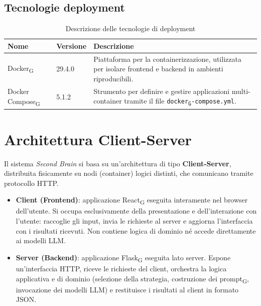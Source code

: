 \documentclass[11pt,a4paper]{article}
\newcommand{\gls}[1]{#1\textsubscript{G}}
\begin{document}
\subsection{Tecnologie deployment}
\begin{table}[H]
    \centering
    \begin{tabular}{|p{}|p{}|p{}|}
        \hline
        \textbf{Nome} & \textbf{Versione} & \textbf{Descrizione} \\
        \hline
        \gls{Docker} & 29.4.0 & Piattaforma per la containerizzazione, utilizzata per isolare frontend e backend in ambienti riproducibili. \\
        \hline
        \gls{Docker Compose} & 5.1.2 & Strumento per definire e gestire applicazioni multi-container tramite il file \texttt{\gls{docker}-compose.yml}. \\
        \hline
    \end{tabular}
    \caption{Descrizione delle tecnologie di deployment}
    \label{tab:tecnologie_deployment}
\end{table}

\newpage

\section{Architettura Client-Server}
Il sistema \textit{Second Brain} si basa su un'architettura di tipo \textbf{Client-Server}, distribuita fisicamente su nodi (container) logici distinti, che comunicano tramite protocollo HTTP.

\begin{itemize}
    \item \textbf{Client (Frontend)}: applicazione \gls{React} eseguita interamente nel browser dell'utente. Si occupa esclusivamente della presentazione e dell'interazione con l'utente: raccoglie gli input, invia le richieste al server e aggiorna l'interfaccia con i risultati ricevuti. Non contiene logica di dominio né accede direttamente ai modelli LLM.
    
    \item \textbf{Server (Backend)}: applicazione \gls{Flask} eseguita lato server. Espone un'interfaccia HTTP, riceve le richieste del client, orchestra la logica applicativa e di dominio (selezione della strategia, costruzione dei \gls{prompt}, invocazione dei modelli LLM) e restituisce i risultati al client in formato JSON.
\end{itemize}
\end{document}
